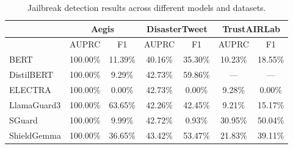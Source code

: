 \begin{table}[!ht]
\caption{Jailbreak detection results across different models and datasets.}
\label{tab:jailbreak-experiments}
\centering
\footnotesize
\def\arraystretch{1.1}
\setlength{\tabcolsep}{8pt}
\begin{tabular}{|l||cc|cc|cc|}
\hline
& \multicolumn{2}{c|}{Aegis} & \multicolumn{2}{c|}{DisasterTweet} & \multicolumn{2}{c|}{TrustAIRLab} \\
\hline \hline
& AUPRC & F1 & AUPRC & F1 & AUPRC & F1\\
BERT & 100.00\% & 11.39\% & 40.16\% & 35.30\% & 10.23\% & 18.55\% \\
DistilBERT & 100.00\% & 9.29\% & 42.73\% & 59.86\% & --- & --- \\
ELECTRA & 100.00\% & 0.00\% & 42.73\% & 0.00\% & 9.28\% & 0.00\% \\
LlamaGuard3 & 100.00\% & 63.65\% & 42.26\% & 42.45\% & 9.21\% & 15.17\% \\
SGuard & 100.00\% & 9.99\% & 42.72\% & 0.93\% & 30.95\% & 50.04\% \\
ShieldGemma & 100.00\% & 36.65\% & 43.42\% & 53.47\% & 21.83\% & 39.11\% \\
\hline
\end{tabular}
\end{table}
